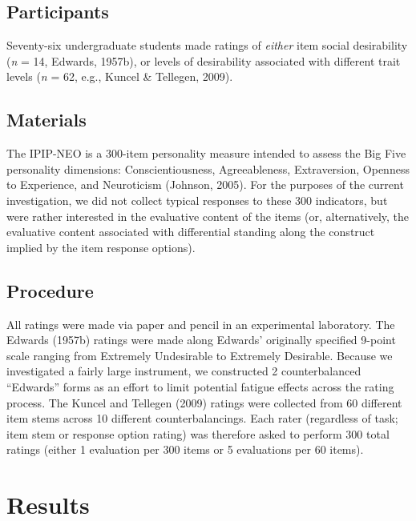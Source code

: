 \documentclass[
  ,jou]{apa6}
\begin{document}
\subsection{Participants}\label{participants}

Seventy-six undergraduate students made ratings of \emph{either} item social desirability (\emph{n} = 14, Edwards, 1957b), or levels of desirability associated with different trait levels (\emph{n} = 62, e.g., Kuncel \& Tellegen, 2009).

\subsection{Materials}\label{materials}

The IPIP-NEO is a 300-item personality measure intended to assess the Big Five personality dimensions: Conscientiousness, Agreeableness, Extraversion, Openness to Experience, and Neuroticism (Johnson, 2005). For the purposes of the current investigation, we did not collect typical responses to these 300 indicators, but were rather interested in the evaluative content of the items (or, alternatively, the evaluative content associated with differential standing along the construct implied by the item response options).

\subsection{Procedure}\label{procedure}

All ratings were made via paper and pencil in an experimental laboratory. The Edwards (1957b) ratings were made along Edwards' originally specified 9-point scale ranging from Extremely Undesirable to Extremely Desirable. Because we investigated a fairly large instrument, we constructed 2 counterbalanced ``Edwards'' forms as an effort to limit potential fatigue effects across the rating process. The Kuncel and Tellegen (2009) ratings were collected from 60 different item stems across 10 different counterbalancings. Each rater (regardless of task; item stem or response option rating) was therefore asked to perform 300 total ratings (either 1 evaluation per 300 items or 5 evaluations per 60 items).

\section{Results}\label{results}
\end{document}
